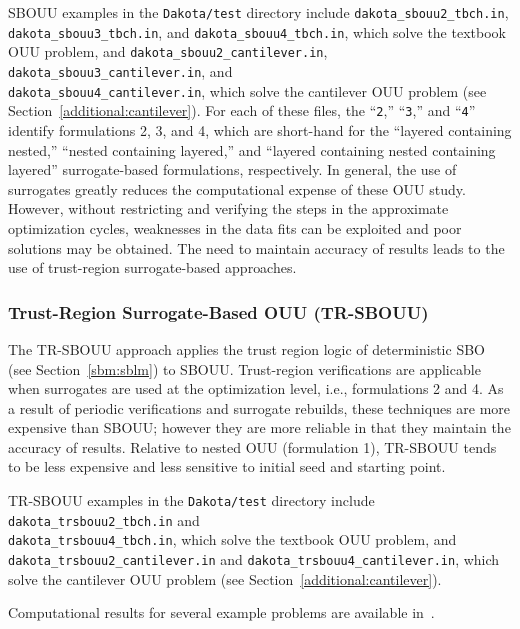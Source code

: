 SBOUU examples in the \texttt{Dakota/test} directory include
\texttt{dakota\_sbouu2\_tbch.in},\\ \texttt{dakota\_sbouu3\_tbch.in},
and \texttt{dakota\_sbouu4\_tbch.in}, which solve the textbook OUU
problem, and \texttt{dakota\_sbouu2\_cantilever.in},
\texttt{dakota\_sbouu3\_cantilever.in}, and\\
\texttt{dakota\_sbouu4\_cantilever.in}, which solve the cantilever OUU
problem (see Section~\ref{additional:cantilever}). For each of these
files, the ``\texttt{2},'' ``\texttt{3},'' and ``\texttt{4}'' identify
formulations 2, 3, and 4, which are short-hand for the ``layered
containing nested,'' ``nested containing layered,'' and ``layered
containing nested containing layered'' surrogate-based formulations,
respectively. In general, the use of surrogates greatly reduces the
computational expense of these OUU study. However, without restricting
and verifying the steps in the approximate optimization cycles,
weaknesses in the data fits can be exploited and poor solutions may be
obtained. The need to maintain accuracy of results leads to the use of
trust-region surrogate-based approaches.

\subsubsection{Trust-Region Surrogate-Based OUU (TR-SBOUU)}\label{models:ex:ouu:trsb}

The TR-SBOUU approach applies the trust region logic of deterministic
SBO (see Section~\ref{sbm:sblm}) to SBOUU. Trust-region verifications
are applicable when surrogates are used at the optimization level,
i.e., formulations 2 and 4. As a result of periodic verifications and
surrogate rebuilds, these techniques are more expensive than SBOUU;
however they are more reliable in that they maintain the accuracy of
results. Relative to nested OUU (formulation 1), TR-SBOUU tends to be
less expensive and less sensitive to initial seed and starting point.

TR-SBOUU examples in the \texttt{Dakota/test} directory include
\texttt{dakota\_trsbouu2\_tbch.in} and\\
\texttt{dakota\_trsbouu4\_tbch.in}, which solve the textbook OUU
problem, and\\ \texttt{dakota\_trsbouu2\_cantilever.in} and
\texttt{dakota\_trsbouu4\_cantilever.in}, which solve the cantilever
OUU problem (see Section~\ref{additional:cantilever}).

Computational results for several example problems are available
in~\cite{Eld02}.

